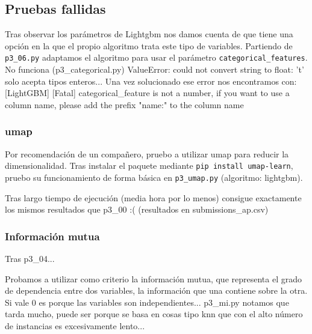 \documentclass[a4paper, 20pt]{article}
\begin{document}

\subsection{Pruebas fallidas}
Tras observar los parámetros de Lightgbm nos damos cuenta de que tiene una opción en la que el propio algoritmo trata este tipo de variables. Partiendo de \texttt{p3\_06.py} adaptamos el algoritmo para usar el parámetro \texttt{categorical\_features}.
 No funciona (p3\_categorical.py)
 ValueError: could not convert string to float: 't'
 solo acepta tipos enteros... Una vez solucionado ese error nos encontramos con:
 [LightGBM] [Fatal] categorical\_feature is not a number,
if you want to use a column name,
please add the prefix "name:" to the column name

\subsubsection{umap}
Por recomendación de un compañero, pruebo a utilizar umap para reducir la dimensionalidad. Tras instalar el paquete mediante \texttt{pip install umap-learn}, pruebo su funcionamiento de forma básica en \texttt{p3\_umap.py} (algoritmo: lightgbm).

Tras largo tiempo de ejecución (media hora por lo menos) consigue exactamente los mismos resultados que p3\_00 :( (resultados en submissions\_ap.csv)
\subsubsection{Información mutua}
Tras p3\_04...

Probamos a utilizar como criterio la información mutua, que representa el grado de dependencia entre dos variables, la información que una contiene sobre la otra. Si vale 0 es porque las variables son independientes... p3\_mi.py
notamos que tarda mucho, puede ser porque se basa en cosas tipo knn que con el alto número de instancias es excesivamente lento...
\end{document}
